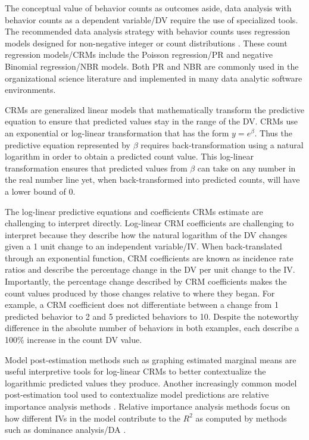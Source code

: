 \documentclass[man]{apa7}
\begin{document}
	The conceptual value of behavior counts as outcomes aside, data analysis with behavior counts as a dependent variable/DV require the use of specialized tools.
	The recommended data analysis strategy with behavior counts uses regression models designed for non-negative integer or count distributions \parencite[e.g.,][]{blevins2015count}.
	These count regression models/CRMs include the Poisson regression/PR and negative Binomial regression/NBR models.
	Both PR and NBR are commonly used in the organizational science literature and implemented in many data analytic software environments.
	
	CRMs are generalized linear models that mathematically transform the predictive equation to ensure that predicted values stay in the range of the DV.
	CRMs use an exponential or log-linear transformation that has the form $y = e^{\beta}$. 
	Thus the predictive equation represented by $\beta$ requires back-transformation using a natural logarithm in order to obtain a predicted count value.
	This log-linear transformation ensures that predicted values from $\beta$ can take on any number in the real number line yet, when back-transformed into predicted counts, will have a lower bound of 0.
	
	The log-linear predictive equations and coefficients CRMs estimate are challenging to interpret directly.
	Log-linear CRM coefficients are challenging to interpret because they describe how the natural logarithm of the DV changes given a 1 unit change to an independent variable/IV. 
	When back-translated through an exponential function, CRM coefficients are known as incidence rate ratios and describe the percentage change in the DV per unit change to the IV.
	Importantly, the percentage change described by CRM coefficients makes the count values produced by those changes relative to where they began.
	For example, a CRM coefficient does not differentiate between a change from 1 predicted behavior to 2 and 5 predicted behaviors to 10. 
	Despite the noteworthy difference in the absolute number of behaviors in both examples, each describe a 100\% increase in the count DV value.
		
	Model post-estimation methods such as graphing estimated marginal means are useful interpretive tools for log-linear CRMs to better contextualize the logarithmic predicted values they produce.
	Another increasingly common model post-estimation tool used to contextualize model predictions are relative importance analysis methods \parencite{tonidandel2011relative}. 
	Relative importance analysis methods focus on how different IVs in the model contribute to the $R^2$ as computed by methods such as dominance analysis/DA \parencite{azen2003dominance}.
	
\end{document}
